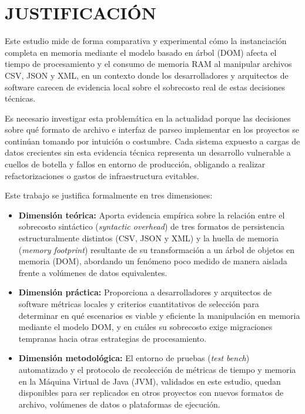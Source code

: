 \section{JUSTIFICACIÓN}

Este estudio mide de forma comparativa y experimental cómo la instanciación completa en memoria mediante el modelo basado en árbol (DOM) afecta el tiempo de procesamiento y el consumo de memoria RAM al manipular archivos CSV, JSON y XML, en un contexto donde los desarrolladores y arquitectos de software carecen de evidencia local sobre el sobrecosto real de estas decisiones técnicas.

Es necesario investigar esta problemática en la actualidad porque las decisiones sobre qué formato de archivo e interfaz de parseo implementar en los proyectos se continúan tomando por intuición o costumbre. Cada sistema expuesto a cargas de datos crecientes sin esta evidencia técnica representa un desarrollo vulnerable a cuellos de botella y fallos en entorno de producción, obligando a realizar refactorizaciones o gastos de infraestructura evitables.

Este trabajo se justifica formalmente en tres dimensiones:
\begin{itemize}
    \item \textbf{Dimensión teórica:} Aporta evidencia empírica sobre la relación entre el sobrecosto sintáctico (\textit{syntactic overhead}) de tres formatos de persistencia estructuralmente distintos (CSV, JSON y XML) y la huella de memoria (\textit{memory footprint}) resultante de su transformación a un árbol de objetos en memoria (DOM), abordando un fenómeno poco medido de manera aislada frente a volúmenes de datos equivalentes.
    \item \textbf{Dimensión práctica:} Proporciona a desarrolladores y arquitectos de software métricas locales y criterios cuantitativos de selección para determinar en qué escenarios es viable y eficiente la manipulación en memoria mediante el modelo DOM, y en cuáles su sobrecosto exige migraciones tempranas hacia otras estrategias de procesamiento.
    \item \textbf{Dimensión metodológica:} El entorno de pruebas (\textit{test bench}) automatizado y el protocolo de recolección de métricas de tiempo y memoria en la Máquina Virtual de Java (JVM), validados en este estudio, quedan disponibles para ser replicados en otros proyectos con nuevos formatos de archivo, volúmenes de datos o plataformas de ejecución.
\end{itemize}

